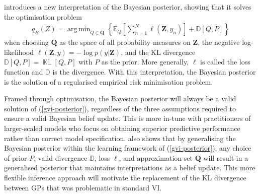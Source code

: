 \documentclass{article}
\newcommand{\KLD}{\operatorname{\mathbb{KL}}}
\DeclareMathOperator*{\argmin}{arg\,min}
\numberwithin{equation}{section}
\begin{document}
\cite{knoblauch2022optimization} introduces a new interpretation of the Bayesian posterior, showing that it solves the optimisation problem
\begin{align}
    q_B(Z) = \argmin_{Q \in \boldsymbol{Q}} \left\{\mathbb{E}_{Q}\left[\sum_{n=1}^N \ell \left(\mathbf{Z}, y_n\right)\right] + \mathbb{D}\left[Q, P\right]\right\}
    \label{gvi-posterior}
\end{align}
when choosing $\boldsymbol{Q}$ as the space of all probability measures on $\mathbf{Z}$, the negative log-likelihood $\ell(\mathbf{Z}, y) =-\log p\left(y \vert \mathbf{Z}\right)$,  and the KL divergence $\mathbb{D}\left[Q, P\right] = \KLD\left[Q, P\right]$ with $P$ as the prior.
More generally, $\ell$ is called the loss function and $\mathbb{D}$ is the divergence. With this interpretation, the Bayesian posterior is the solution of a regularised empirical risk minimisation problem.

Framed through optimisation, the Bayesian posterior will always be a valid solution of (\ref{gvi-posterior}), regardless of the three assumptions required to ensure a valid Bayesian belief update.
This is more in-tune with practitioners of larger-scaled models who focus on obtaining superior predictive performance rather than correct model specification.
\cite{knoblauch2022optimization} also shows that by generalising the Bayesian posterior within the learning framework of (\ref{gvi-posterior}), any choice of prior $P$, valid divergence $\mathbb{D}$, loss $\ell$, and approximation set $\boldsymbol{Q}$ will result in a generalised posterior that maintains interpretations as a belief update.
This more flexible inference approach will motivate the replacement of the KL divergence between GPs that was problematic in standard VI.
\end{document}
